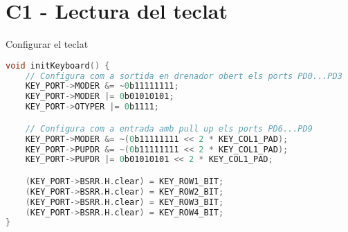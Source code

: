 \documentclass{report}
\begin{document}
    \section{C1 - Lectura del teclat}
    Configurar el teclat\\
    \begin{lstlisting}[language=C]
void initKeyboard() {
    // Configura com a sortida en drenador obert els ports PD0...PD3
    KEY_PORT->MODER &= ~0b11111111;
    KEY_PORT->MODER |= 0b01010101;
    KEY_PORT->OTYPER |= 0b1111;

    // Configura com a entrada amb pull up els ports PD6...PD9
    KEY_PORT->MODER &= ~(0b11111111 << 2 * KEY_COL1_PAD);
    KEY_PORT->PUPDR &= ~(0b11111111 << 2 * KEY_COL1_PAD);
    KEY_PORT->PUPDR |= 0b01010101 << 2 * KEY_COL1_PAD;

    (KEY_PORT->BSRR.H.clear) = KEY_ROW1_BIT;
    (KEY_PORT->BSRR.H.clear) = KEY_ROW2_BIT;
    (KEY_PORT->BSRR.H.clear) = KEY_ROW3_BIT;
    (KEY_PORT->BSRR.H.clear) = KEY_ROW4_BIT;
}\end{lstlisting}
\end{document}
